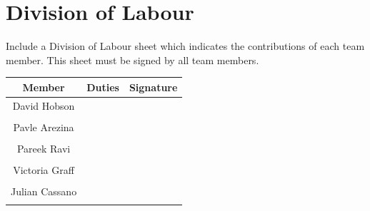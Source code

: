 \documentclass[12pt, titlepage]{article}
\begin{document}
\section{Division of Labour}
\label{sec:division_of_labour}
Include a Division of Labour sheet which indicates the contributions of each team member. This sheet must be signed by all team members.
\begin{table}[h!]
\centering

\begin{tabular}{|c|c|c|}
\hline
{\bf Member} & {\bf Duties}&{\bf Signature}\\
\hline
{David Hobson} & { } & { }\\
{} & {}  & {}\\
\hline
{Pavle Arezina} & {} & {}\\
{} & {} & {}\\
\hline
{Pareek Ravi} & {} & {}\\
{} & {} & {}\\
\hline
{Victoria Graff} & {} & {}\\
{} & {} & {}\\
\hline
{Julian Cassano} & {} & {}\\
{} & {} & {}\\
\hline
\end{tabular}

\end{table}

\newpage
\end{document}
